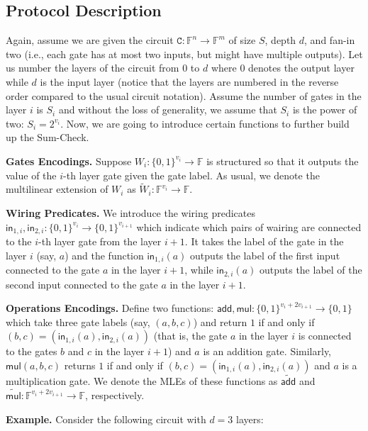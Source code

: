 \documentclass{gkr-template}
\begin{document}
\subsection*{Protocol Description}

Again, assume we are given the circuit $\mathtt{C}: \mathbb{F}^n \to
\mathbb{F}^m$ of size $S$, depth $d$, and fan-in two (i.e., each gate has at
most two inputs, but might have multiple outputs). Let us number the layers of
the circuit from $0$ to $d$ where $0$ denotes the output layer while $d$ is the
input layer (notice that the layers are numbered in the reverse order compared
to the usual circuit notation). Assume the number of gates in the layer $i$ is
$S_i$ and without the loss of generality, we assume that $S_i$ is the power of
two: $S_i = 2^{v_i}$. Now, we are going to introduce certain functions 
to further build up the Sum-Check.

\textbf{Gates Encodings.} Suppose $W_i: \{0,1\}^{v_i} \to \mathbb{F}$ is
structured so that it outputs the value of the $i$-th layer gate given the gate
label. As usual, we denote the multilinear extension of $W_i$ as
$\widetilde{W}_i: \mathbb{F}^{v_i} \to \mathbb{F}$.

\textbf{Wiring Predicates.} We introduce the wiring predicates
$\mathsf{in}_{1,i}, \mathsf{in}_{2,i}: \{0,1\}^{v_i} \to \{0,1\}^{v_{i+1}}$
which indicate which pairs of wairing are connected to the $i$-th layer gate
from the layer $i+1$. It takes the label of the gate in the layer $i$ (say, $a$)
and the function $\mathsf{in}_{1,i}(a)$ outputs the label of the first input
connected to the gate $a$ in the layer $i+1$, while $\mathsf{in}_{2,i}(a)$
outputs the label of the second input connected to the gate $a$ in the layer
$i+1$.

\textbf{Operations Encodings.} Define two functions: $\mathsf{add},\mathsf{mul}:
\{0,1\}^{v_i+2v_{i+1}} \to \{0,1\}$ which take three gate labels (say,
$(a,b,c)$) and return $1$ if and only if $(b,c)=(\mathsf{in}_{1,i}(a),
\mathsf{in}_{2,i}(a))$ (that is, the gate $a$ in the layer $i$ is connected to
the gates $b$ and $c$ in the layer $i+1$) and $a$ is an addition gate.
Similarly, $\mathsf{mul}(a,b,c)$ returns $1$ if and only if
$(b,c)=(\mathsf{in}_{1,i}(a), \mathsf{in}_{2,i}(a))$ and $a$ is a multiplication
gate. We denote the MLEs of these functions as $\widetilde{\mathsf{add}}$ and
$\widetilde{\mathsf{mul}}: \mathbb{F}^{v_i+2v_{i+1}} \to \mathbb{F}$,
respectively.

\textbf{Example.} Consider the following circuit with $d=3$ layers:
\end{document}
